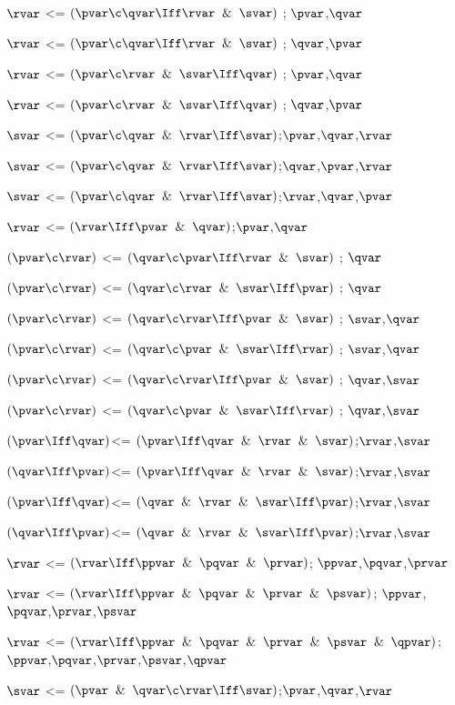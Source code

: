 $\rvar$ <= $(\pvar \c \qvar \Iff \rvar \And \svar)$ ; $\pvar$,$\qvar$

$\rvar$ <= $(\pvar \c \qvar \Iff \rvar \And \svar)$ ; $\qvar$,$\pvar$

$\rvar$ <= $(\pvar \c \rvar \And \svar \Iff \qvar)$ ; $\pvar$,$\qvar$

$\rvar$ <= $(\pvar \c \rvar \And \svar \Iff \qvar)$ ; $\qvar$,$\pvar$

$\svar$ <=  $(\pvar \c \qvar\And \rvar\Iff \svar)$;$\pvar$,$\qvar$,$\rvar$

$\svar$ <=  $(\pvar \c \qvar\And \rvar\Iff \svar)$;$\qvar$,$\pvar$,$\rvar$

$\svar$ <=  $(\pvar \c \qvar\And \rvar\Iff \svar)$;$\rvar$,$\qvar$,$\pvar$

$\rvar$ <=  $(\rvar\Iff\pvar \And \qvar)$;$\pvar$,$\qvar$

$(\pvar \c \rvar)$ <= $(\qvar \c \pvar \Iff \rvar \And \svar)$ ; $\qvar$

$(\pvar \c \rvar)$ <= $(\qvar \c  \rvar \And \svar \Iff \pvar)$ ; $\qvar$

$(\pvar \c \rvar)$ <= $(\qvar \c \rvar \Iff \pvar \And \svar)$ ; $\svar$,$\qvar$

$(\pvar \c \rvar)$ <= $(\qvar \c  \pvar \And \svar \Iff \rvar)$ ; $\svar$,$\qvar$

$(\pvar \c \rvar)$ <= $(\qvar \c \rvar \Iff \pvar \And \svar)$ ; $\qvar$,$\svar$

$(\pvar \c \rvar)$ <= $(\qvar \c  \pvar \And \svar \Iff \rvar)$ ; $\qvar$,$\svar$

$(\pvar \Iff \qvar)$<= $(\pvar \Iff \qvar \And \rvar \And \svar)$;$\rvar$,$\svar$

$(\qvar \Iff \pvar)$<= $(\pvar \Iff \qvar \And \rvar \And \svar)$;$\rvar$,$\svar$

$(\pvar \Iff \qvar)$<= $(\qvar \And \rvar \And \svar\Iff\pvar)$;$\rvar$,$\svar$

$(\qvar \Iff \pvar)$<= $(\qvar \And \rvar \And \svar\Iff\pvar)$;$\rvar$,$\svar$

$\rvar$ <= $(\rvar \Iff \ppvar \And \pqvar \And \prvar )$; $\ppvar$,$\pqvar$,$\prvar$

$\rvar$ <= $(\rvar \Iff \ppvar \And \pqvar \And \prvar \And \psvar )$; $\ppvar$,$\pqvar$,$\prvar$,$\psvar$

$\rvar$ <= $(\rvar \Iff \ppvar \And \pqvar \And \prvar \And \psvar \And \qpvar)$; $\ppvar$,$\pqvar$,$\prvar$,$\psvar$,$\qpvar$

$\svar$ <= $(\pvar \And \qvar \c \rvar \Iff \svar)$;$\pvar$,$\qvar$,$\rvar$

